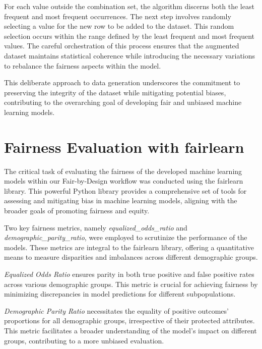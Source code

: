\documentclass[12pt,a4paper,openright,twoside]{book}
\begin{document}


For each value outside the combination set, the algorithm discerns both the least frequent and most frequent occurrences. The next step involves randomly selecting a value for the new row to be added to the dataset. This random selection occurs within the range defined by the least frequent and most frequent values. The careful orchestration of this process ensures that the augmented dataset maintains statistical coherence while introducing the necessary variations to rebalance the fairness aspects within the model.

This deliberate approach to data generation underscores the commitment to preserving the integrity of the dataset while mitigating potential biases, contributing to the overarching goal of developing fair and unbiased machine learning models.


\section{Fairness Evaluation with fairlearn}

The critical task of evaluating the fairness of the developed machine learning models within our Fair-by-Design workflow was conducted using the fairlearn library. This powerful Python library provides a comprehensive set of tools for assessing and mitigating bias in machine learning models, aligning with the broader goals of promoting fairness and equity.

Two key fairness metrics, namely \emph{equalized\_odds\_ratio} and \emph{demographic\_parity\_ratio}, were employed to scrutinize the performance of the models. These metrics are integral to the fairlearn library, offering a quantitative means to measure disparities and imbalances across different demographic groups.

\emph{Equalized Odds Ratio} ensures parity in both true positive and false positive rates across various demographic groups. This metric is crucial for achieving fairness by minimizing discrepancies in model predictions for different subpopulations.

\emph{Demographic Parity Ratio} necessitates the equality of positive outcomes' proportions for all demographic groups, irrespective of their protected attributes. This metric facilitates a broader understanding of the model's impact on different groups, contributing to a more unbiased evaluation.
\end{document}
